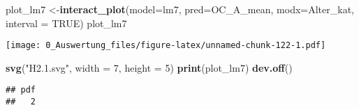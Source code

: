 \documentclass[
]{article}
\newenvironment{Shaded}{\begin{snugshade}}{\end{snugshade}}
\newcommand{\AttributeTok}[1]{\textcolor[rgb]{0.13,0.29,0.53}{#1}}
\newcommand{\ConstantTok}[1]{\textcolor[rgb]{0.56,0.35,0.01}{#1}}
\newcommand{\DecValTok}[1]{\textcolor[rgb]{0.00,0.00,0.81}{#1}}
\newcommand{\FunctionTok}[1]{\textcolor[rgb]{0.13,0.29,0.53}{\textbf{#1}}}
\newcommand{\NormalTok}[1]{#1}
\newcommand{\OtherTok}[1]{\textcolor[rgb]{0.56,0.35,0.01}{#1}}
\newcommand{\StringTok}[1]{\textcolor[rgb]{0.31,0.60,0.02}{#1}}
\begin{document}
\begin{Shaded}
\begin{Highlighting}[]
\NormalTok{plot\_lm7 }\OtherTok{\textless{}{-}}\FunctionTok{interact\_plot}\NormalTok{(}\AttributeTok{model=}\NormalTok{lm7, }\AttributeTok{pred=}\NormalTok{OC\_A\_mean, }\AttributeTok{modx=}\NormalTok{Alter\_kat,}
              \AttributeTok{interval =} \ConstantTok{TRUE}\NormalTok{)}
\NormalTok{plot\_lm7}
\end{Highlighting}
\end{Shaded}

\texttt{[image: 0\_Auswertung\_files/figure-latex/unnamed-chunk-122-1.pdf]}

\begin{Shaded}
\begin{Highlighting}[]
\FunctionTok{svg}\NormalTok{(}\StringTok{"H2.1.svg"}\NormalTok{, }\AttributeTok{width =} \DecValTok{7}\NormalTok{, }\AttributeTok{height =} \DecValTok{5}\NormalTok{)}
\FunctionTok{print}\NormalTok{(plot\_lm7)}
\FunctionTok{dev.off}\NormalTok{()}
\end{Highlighting}
\end{Shaded}

\begin{verbatim}
## pdf 
##   2
\end{verbatim}
\end{document}

